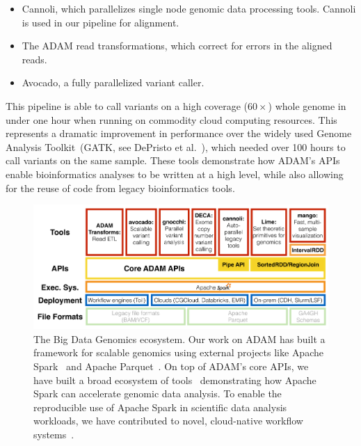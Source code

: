 \documentclass[phd]{ucbthesis}
\begin{document}
\begin{itemize}
\item {Cannoli}, which parallelizes single node genomic data processing
  tools. {Cannoli} is used in our pipeline for alignment.
\item The {ADAM} read transformations, which correct for errors in the
  aligned reads.
\item {Avocado}, a fully parallelized variant caller.
\end{itemize}

This pipeline is able to call variants on a high coverage ($60\times$) whole
genome in under one hour when running on commodity cloud computing resources.
This represents a dramatic improvement in performance over the widely used
Genome Analysis Toolkit~(GATK, see DePristo et al.~\cite{depristo11}), which
needed over 100 hours to call variants on the same sample. These tools
demonstrate how {ADAM}'s APIs enable bioinformatics analyses to be
written at a high level, while also allowing for the reuse of code from legacy
bioinformatics tools.

\begin{figure}[h]
  \begin{center}
    \includegraphics[width=0.95\linewidth]{graphs/bdgenomics-stack.pdf}
  \end{center}
  \caption{The Big Data Genomics ecosystem. Our work on {ADAM} has
    built a framework for scalable genomics using external projects like
    {Apache Spark}~\cite{zaharia12} and {Apache
      Parquet}~\cite{parquet}. On top of {ADAM}'s core APIs, we have
    built a broad ecosystem of tools~\cite{linderman17, morrow17, tu16}
    demonstrating how {Apache Spark} can accelerate genomic data
    analysis. To enable the reproducible use of {Apache Spark} in
    scientific data analysis workloads, we have contributed to novel,
    cloud-native workflow systems~\cite{vivian17}.}
  \label{fig:bdg}
\end{figure}
\end{document}
